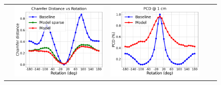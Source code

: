 \def\rot#1{\rotatebox{90}{#1}}
\begin{figure}
    \centering
    \begin{tabular}{ccccc}
    \rot{~~~~~\textbf{Synthetic}} &
    \includegraphics[scale=0.1]{main/chapter04/data/plot_chamfer_synth.png} &
    \includegraphics[scale=0.1]{main/chapter04/data/plot_pcd_1_synth.png} &

\end{tabular}
\end{figure}
